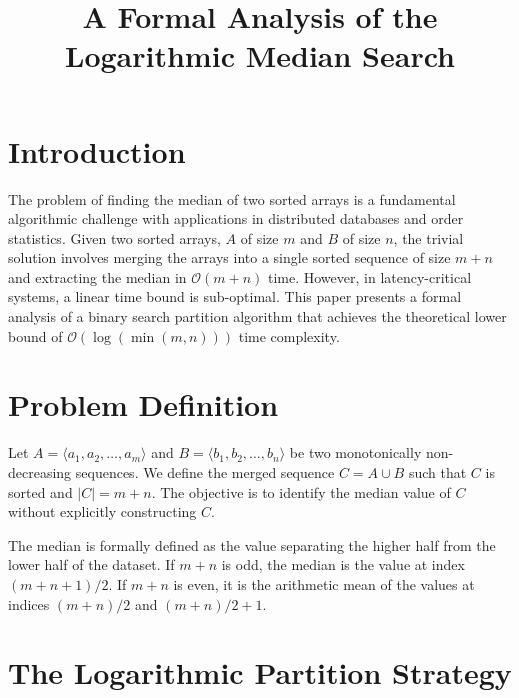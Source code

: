 \documentclass[10pt,journal,compsoc]{IEEEtran}
\begin{document}
\title{A Formal Analysis of the Logarithmic Median Search}

\author{ }


\maketitle
\IEEEdisplaynontitleabstractindextext
\IEEEpeerreviewmaketitle

\section{Introduction}

The problem of finding the median of two sorted arrays is a fundamental algorithmic challenge with applications in distributed databases and order statistics. Given two sorted arrays, $A$ of size $m$ and $B$ of size $n$, the trivial solution involves merging the arrays into a single sorted sequence of size $m + n$ and extracting the median in $\mathcal{O}(m + n)$ time. However, in latency-critical systems, a linear time bound is sub-optimal. This paper presents a formal analysis of a binary search partition algorithm that achieves the theoretical lower bound of $\mathcal{O}(\log(\min(m, n)))$ time complexity.

\section{Problem Definition}

Let $A = \langle a_1, a_2, \dots, a_m \rangle$ and $B = \langle b_1, b_2, \dots, b_n \rangle$ be two monotonically non-decreasing sequences. We define the merged sequence $C = A \cup B$ such that $C$ is sorted and $|C| = m + n$. The objective is to identify the median value of $C$ without explicitly constructing $C$.

The median is formally defined as the value separating the higher half from the lower half of the dataset. If $m+n$ is odd, the median is the value at index $(m+n+1)/2$. If $m+n$ is even, it is the arithmetic mean of the values at indices $(m+n)/2$ and $(m+n)/2 + 1$.

\section{The Logarithmic Partition Strategy}
\end{document}
